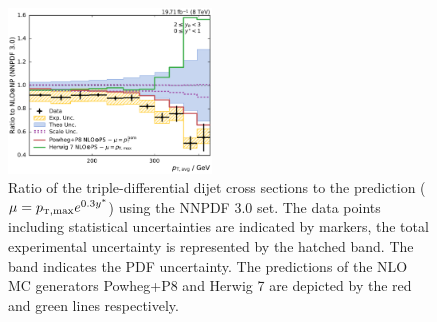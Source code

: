 \begin{figure}[htbp]
    \includegraphics[width=0.48\textwidth]{figures/measurement/ratio_to_NNPDF30+np_varcomp_yb2ys0.pdf}
    \caption[Ratio of measured cross sections to predictions using different MC event generators]{
    Ratio of the triple-differential dijet cross sections to the \NLOJETPP
    prediction ($\mu=\ptmax e^{0.3 \ystar}$) using the NNPDF 3.0 set. The data
    points including statistical uncertainties are indicated by markers, the
    total experimental uncertainty is represented by the hatched band. The band
    indicates the PDF uncertainty. The predictions of the NLO MC generators
    Powheg+P8 and Herwig 7 are depicted by the red and green lines respectively.}
    \label{fig:ratio_nnpdf30_mccomp_nlo}
\end{figure}



